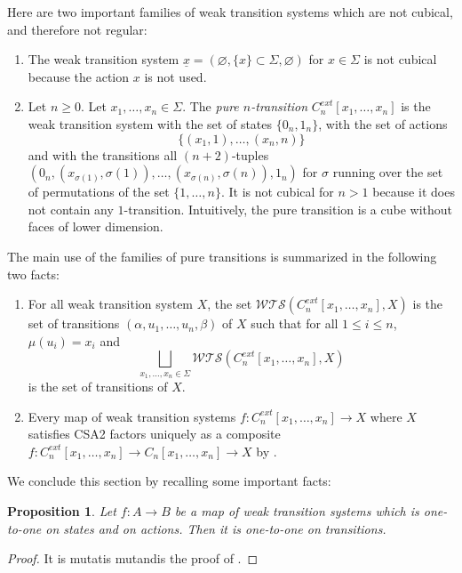 \documentclass[a4paper,12pt]{amsart}
\newtheorem{prop}[thm]{Proposition}
\begin{document}
Here are two important families of weak transition systems which are
not cubical, and therefore not regular:
\begin{enumerate}
\item The weak transition system $\underline{x} = (\varnothing, \{x\}
  \subset \Sigma, \varnothing)$ for $x \in \Sigma$ is not cubical
  because the action $x$ is not used. 
\item Let $n {\geqslant} 0$. Let $x_1,\dots,x_n \in \Sigma$. The \emph{pure
    $n$-transition} $C^{ext}_n[x_1,\dots,x_n]$ is the weak transition
  system with the set of states $\{0_n,1_n\}$, with the set of actions
  \[\{(x_1,1), \dots, (x_n,n)\}\] and with the transitions all
  $(n+2)$-tuples $(0_n,(x_{\sigma(1)},\sigma(1)), \dots,
  (x_{\sigma(n)},\sigma(n)),1_n)$ for $\sigma$ running over the set of
  permutations of the set $\{1,\dots ,n\}$. It is not cubical for $n>
  1$ because it does not contain any $1$-transition. Intuitively, the
  pure transition is a cube without faces of lower dimension.
\end{enumerate}
The main use of the families of pure transitions is summarized in the
following two facts: 
\begin{enumerate}
\item For all weak transition system $X$, the set
  ${\mathcal{W\!T\!S}}(C^{ext}_n[x_1,\dots,x_n],X)$ is the set of transitions
  $(\alpha,u_1,\dots,u_n,\beta)$ of $X$ such that for all $1{\leqslant} i{\leqslant}
  n$, $\mu(u_i)=x_i$ and
  \[\bigsqcup_{x_1,\dots,x_n\in \Sigma}{\mathcal{W\!T\!S}}(C^{ext}_n[x_1,\dots,x_n],X)\]
  is the set of transitions of $X$.
\item Every map of weak transition systems
$f:C^{ext}_n[x_1,\dots,x_n] \to X$ where $X$ satisfies CSA2 factors
uniquely as a composite $f:C^{ext}_n[x_1,\dots,x_n] \to
C_n[x_1,\dots,x_n] \to X$ by \cite[Theorem~5.6]{hdts}.
\end{enumerate}

We conclude this section by recalling some important facts:

\begin{prop} \label{121-121-trans} Let $f:A\to B$ be a map of weak transition
systems which is one-to-one on states and on actions. Then it is
one-to-one on transitions.  \end{prop}

\begin{proof} It is mutatis mutandis the proof of
\cite[Proposition~.4.4]{homotopyprecubical}. \end{proof}
\end{document}
